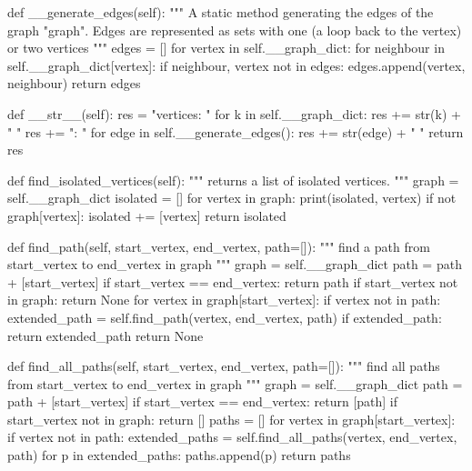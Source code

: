     def __generate_edges(self):
        """ A static method generating the edges of the 
            graph "graph". Edges are represented as sets 
            with one (a loop back to the vertex) or two 
            vertices 
        """
        edges = []
        for vertex in self.__graph_dict:
            for neighbour in self.__graph_dict[vertex]:
                if {neighbour, vertex} not in edges:
                    edges.append({vertex, neighbour})
        return edges

    def __str__(self):
        res = "vertices: "
        for k in self.__graph_dict:
            res += str(k) + " "
        res += "\nedges: "
        for edge in self.__generate_edges():
            res += str(edge) + " "
        return res

    def find_isolated_vertices(self):
        """ returns a list of isolated vertices. """
        graph = self.__graph_dict
        isolated = []
        for vertex in graph:
            print(isolated, vertex)
            if not graph[vertex]:
                isolated += [vertex]
        return isolated

    def find_path(self, start_vertex, end_vertex, path=[]):
        """ find a path from start_vertex to end_vertex 
            in graph """
        graph = self.__graph_dict
        path = path + [start_vertex]
        if start_vertex == end_vertex:
            return path
        if start_vertex not in graph:
            return None
        for vertex in graph[start_vertex]:
            if vertex not in path:
                extended_path = self.find_path(vertex, 
                                               end_vertex, 
                                               path)
                if extended_path: 
                    return extended_path
        return None
    

    def find_all_paths(self, start_vertex, end_vertex, path=[]):
        """ find all paths from start_vertex to 
            end_vertex in graph """
        graph = self.__graph_dict 
        path = path + [start_vertex]
        if start_vertex == end_vertex:
            return [path]
        if start_vertex not in graph:
            return []
        paths = []
        for vertex in graph[start_vertex]:
            if vertex not in path:
                extended_paths = self.find_all_paths(vertex, 
                                                     end_vertex, 
                                                     path)
                for p in extended_paths: 
                    paths.append(p)
        return paths

